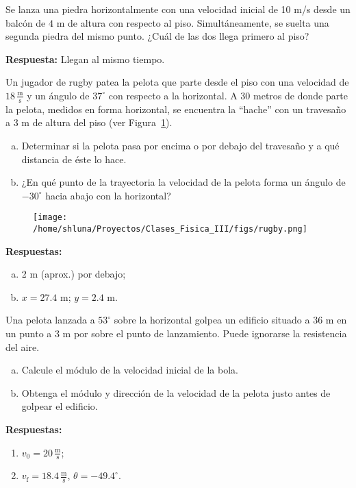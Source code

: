 \documentclass[addpoints]{exam}
\newcommand{\grado}[0]{^{\circ}}
\newcommand{\rta}{\textbf{Respuesta: }}
\newcommand{\rtas}{\textbf{Respuestas: }}
\begin{document}
\begin{questions}
    \question Se lanza una piedra horizontalmente con una velocidad inicial de 10 m/s desde un balcón de $4$ m de altura con respecto al piso. Simultáneamente, se suelta una segunda piedra del mismo punto. ¿Cuál de las dos llega primero al piso? 
    
    \rta Llegan al mismo tiempo.

    \question Un jugador de rugby patea la pelota que parte desde el piso con una velocidad de $18 \, \frac{\text{m}}{\text{s}}$ y un ángulo de $37\grado$ con respecto a la horizontal. A 30 metros de donde parte la pelota, medidos en forma horizontal, se encuentra la ``hache'' con un travesaño a 3 m de altura del piso (ver Figura~\ref{fig:rugby}). 
    \begin{enumerate}[a)]
        \item Determinar si la pelota pasa por encima o por debajo del travesaño y a qué distancia de éste lo hace.
        \item ¿En qué punto de la trayectoria la velocidad de la pelota forma un ángulo de $-30\grado$ hacia abajo con la horizontal?
    \end{enumerate}

    \begin{figure}[ht]
        \centering
        \texttt{[image: /home/shluna/Proyectos/Clases\_Fisica\_III/figs/rugby.png]}
        \caption{ }
        \label{fig:rugby}
    \end{figure}

    \rtas 
    \begin{enumerate}[a)]
        \item 2 m (aprox.) por debajo;
        \item $x=27.4$ m; $y = 2.4$ m.
    \end{enumerate}

    \question Una pelota lanzada a $53\grado$ sobre la horizontal golpea un edificio situado a 36 m en un punto a 3 m por sobre el punto de lanzamiento. Puede ignorarse la resistencia del aire. 
    \begin{enumerate}[a)]
        \item Calcule el módulo de la velocidad inicial de la bola.
        \item Obtenga el módulo y dirección de la velocidad de la pelota justo antes de golpear el edificio.
    \end{enumerate}

    \rtas
    \begin{enumerate}
        \item $v_0 = 20 \, \frac{\text{m}}{\text{s}}$;
        \item $v_\text{f} = 18.4 \, \frac{\text{m}}{\text{s}}$, $\theta = - 49.4\grado$.
    \end{enumerate}


\end{questions}
\end{document}
